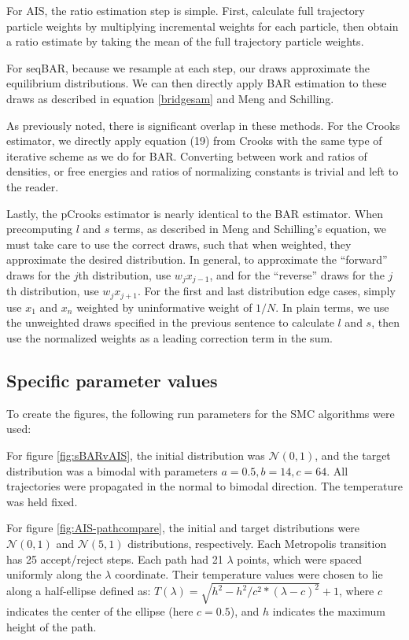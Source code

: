 For AIS, the ratio estimation step is simple.
First, calculate full trajectory particle weights by multiplying incremental weights for each particle, then obtain a ratio estimate by taking the mean of the full trajectory particle weights.

For seqBAR, because we resample at each step, our draws approximate the equilibrium distributions. 
We can then directly apply BAR estimation to these draws as described in equation \eqref{bridgesam} and Meng and Schilling\cite{meng2002warp}.

As previously noted, there is significant overlap in these methods. 
For the Crooks estimator, we directly apply equation (19) from Crooks\cite{crooks2000path} with the same type of iterative scheme as we do for BAR.
Converting between work and ratios of densities, or free energies and ratios of normalizing constants is trivial and left to the reader.

Lastly, the pCrooks estimator is nearly identical to the BAR estimator. 
When precomputing $l$ and $s$ terms, as described in Meng and Schilling's equation, we must take care to use the correct draws, such that when weighted, they approximate the desired distribution.
In general, to approximate the ``forward'' draws for the $j$th distribution, use $w_{j} x_{j-1}$, and for the ``reverse'' draws for the $j$th distribution, use $w_{j} x_{j+1}$.
For the first and last distribution edge cases, simply use $x_1$ and $x_n$ weighted by uninformative weight of $1/N$.
In plain terms, we use the unweighted draws specified in the previous sentence to calculate $l$ and $s$, then use the normalized weights as a leading correction term in the sum.

\subsection{Specific parameter values} %
\label{sub:specific_parameter_values}

To create the figures, the following run parameters for the SMC algorithms were used:

For figure \ref{fig:sBARvAIS}, the initial distribution was $\mathcal{N}(0,1)$, and the target distribution was a bimodal with parameters $a=0.5, b=14, c=64$.
All trajectories were propagated in the normal to bimodal direction.
The temperature was held fixed.

For figure \ref{fig:AIS-pathcompare}, the initial and target distributions were $\mathcal{N}(0,1)$ and $\mathcal{N}(5,1)$ distributions, respectively.
Each Metropolis transition has 25 accept/reject steps.
Each path had 21 $\lambda$ points, which were spaced uniformly along the $\lambda$ coordinate. 
Their temperature values were chosen to lie along a half-ellipse defined as: $T(\lambda)=\sqrt{h^2 - h^2/c^2 * (\lambda-c)^2} +1$, where $c$ indicates the center of the ellipse (here $c=0.5$), and $h$ indicates the maximum height of the path.

